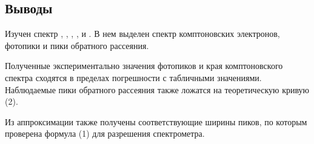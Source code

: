 \subsection*{Выводы}

Изучен спектр \na, \cs, \co, \am, и \eu. В нем выделен спектр комптоновских электронов, фотопики и пики обратного рассеяния.

 Полученные экспериментально значения фотопиков и края комптоновского спектра сходятся в пределах погрешности с табличными значениями. Наблюдаемые пики обратного рассеяния также ложатся на теоретическую кривую (2). 

Из аппроксимации также получены соответствующие ширины пиков, 
по которым проверена формула (1) для разрешения спектрометра. 